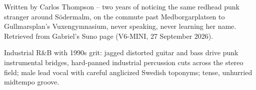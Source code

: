 
\label{sec:two-years-in-sodermalm}
\begin{notes}
Written by Carlos Thompson -- two years of noticing the same redhead punk stranger around Södermalm, on the commute past Medborgarplatsen to Gullmarsplan's Vuxengymnasium, never speaking, never learning her name. Retrieved from Gabriel's Suno page (V6-MINI, 27 September 2026).
\end{notes}
\begin{style}
Industrial R\&B with 1990s grit: jagged distorted guitar and bass drive punk instrumental bridges, hard-panned industrial percussion cuts across the stereo field; male lead vocal with careful anglicized Swedish toponyms; tense, unhurried midtempo groove.
\end{style}
